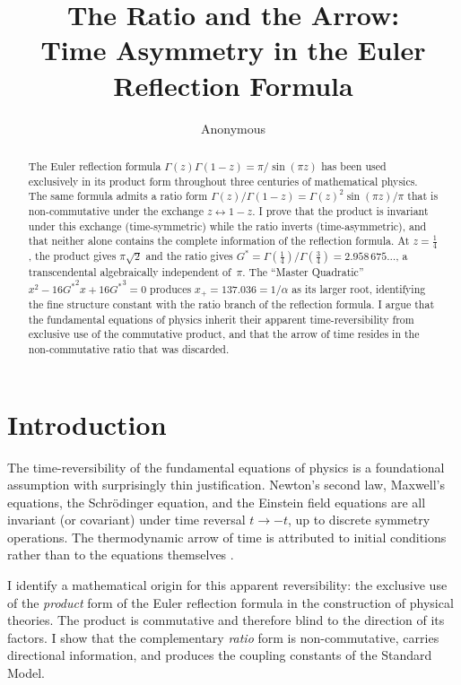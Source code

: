 \documentclass[12pt,reqno]{amsart}
\title[The Ratio and the Arrow]{The Ratio and the Arrow:\\[2pt]
  Time Asymmetry in the Euler Reflection Formula}
\author{Anonymous}
\date{}
\theoremstyle{definition}
\theoremstyle{remark}
\newcommand{\Gstar}{G^{\!*}}
\begin{document}
\begin{abstract}
The Euler reflection formula $\Gamma(z)\Gamma(1-z) = \pi/\sin(\pi z)$ has been used exclusively in its product form throughout three centuries of mathematical physics. The same formula admits a ratio form $\Gamma(z)/\Gamma(1-z) = \Gamma(z)^2\sin(\pi z)/\pi$ that is non-commutative under the exchange $z \leftrightarrow 1-z$. I prove that the product is invariant under this exchange (time-symmetric) while the ratio inverts (time-asymmetric), and that neither alone contains the complete information of the reflection formula. At $z=\frac{1}{4}$, the product gives $\pi\sqrt{2}$ and the ratio gives $\Gstar = \Gamma(\frac{1}{4})/\Gamma(\frac{3}{4}) = 2.958\,675\ldots$, a transcendental algebraically independent of~$\pi$. The ``Master Quadratic'' $x^2 - 16{G^*}^2 x + 16{G^*}^3 = 0$ produces $x_+ = 137.036 = 1/\alpha$ as its larger root, identifying the fine structure constant with the ratio branch of the reflection formula. I argue that the fundamental equations of physics inherit their apparent time-reversibility from exclusive use of the commutative product, and that the arrow of time resides in the non-commutative ratio that was discarded.
\end{abstract}

\maketitle

\section{Introduction}

The time-reversibility of the fundamental equations of physics is a foundational assumption with surprisingly thin justification. Newton's second law, Maxwell's equations, the Schr\"odinger equation, and the Einstein field equations are all invariant (or covariant) under time reversal $t \to -t$, up to discrete symmetry operations. The thermodynamic arrow of time is attributed to initial conditions rather than to the equations themselves \cite{Penrose1989}.

I identify a mathematical origin for this apparent reversibility: the exclusive use of the \emph{product} form of the Euler reflection formula in the construction of physical theories. The product is commutative and therefore blind to the direction of its factors. I show that the complementary \emph{ratio} form is non-commutative, carries directional information, and produces the coupling constants of the Standard Model.
\end{document}
